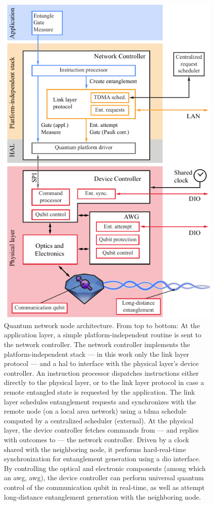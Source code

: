 \begin{figure}
    \centering
    \includegraphics[width=0.6\linewidth]{figures/netnode.pdf}
    \caption{
        Quantum network node architecture. From top to bottom: At the application layer, a simple
        platform-independent routine is sent to the network controller. The network controller
        implements the platform-independent stack --- in this work only the link layer protocol ---
        and a \acrfull{hal} to interface with the physical layer's device controller. An instruction
        processor dispatches instructions either directly to the physical layer, or to the link
        layer protocol in case a remote entangled state is requested by the application. The link
        layer schedules entanglement requests and synchronizes with the remote node (on a local area
        network) using a \acrfull{tdma} schedule computed by a centralized scheduler (external). At
        the physical layer, the device controller fetches commands from --- and replies with
        outcomes to --- the network controller. Driven by a clock shared with the neighboring node,
        it performs hard-real-time synchronization for entanglement generation using a \acrfull{dio}
        interface. By controlling the optical and electronic components (among which an
        \acrlong{awg}, \acrshort{awg}), the device controller can perform universal quantum control
        of the communication qubit in real-time, as well as attempt long-distance entanglement
        generation with the neighboring node.
    }
    \label{fig:netnode}
\end{figure}


